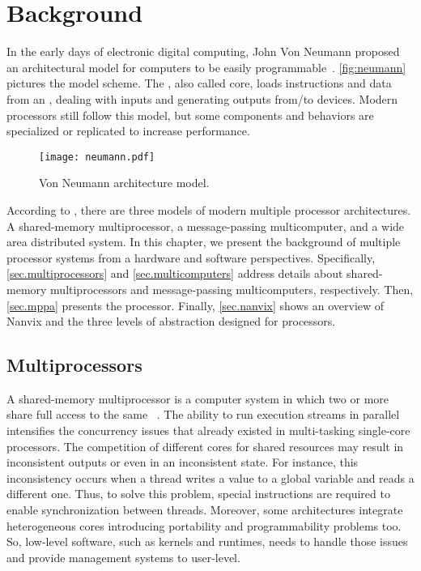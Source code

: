 \chapter{Background}
\label{ch.background}

	In the early days of electronic digital computing, John Von Neumann
	proposed an architectural model for computers to be easily programmable~\cite{von-neumann:model}.
	\autoref{fig:neumann} pictures the model scheme.
	The \cpu, also called core, loads instructions and data from an \mmu,
	dealing with inputs and generating outputs from/to \io devices.
	Modern processors still follow this model, but some components and
	behaviors are specialized or replicated to increase performance.

	\begin{figure}[!tb]
		\centering%
		\caption{Von Neumann architecture model.}%
		\label{fig:neumann}%
		\texttt{[image: neumann.pdf]}%
	\end{figure}
	
	According to , there are three models of
	modern multiple processor architectures.
	A shared-memory multiprocessor, a message-passing multicomputer, and a wide
	area distributed system.
	In this chapter, we present the background of multiple processor systems from
	a hardware and software perspectives.
	Specifically, \autoref{sec.multiprocessors} and \autoref{sec.multicomputers} address
	details about shared-memory multiprocessors and message-passing multicomputers, respectively.
	Then, \autoref{sec.mppa} presents the \mppa processor.
	Finally, \autoref{sec.nanvix} shows an overview of Nanvix \os and the
	three levels of abstraction designed for \lightweight \manycores processors.

	\section{Multiprocessors}
	\label{sec.multiprocessors}

		A shared-memory multiprocessor is a computer system in which two or more \cpus
		share full access to the same \ram~\cite{tanenbaum:4ed}.
		The ability to run execution streams in parallel intensifies the concurrency
		issues that already existed in multi-tasking single-core processors.
		The competition of different cores for shared resources may result in
		inconsistent outputs or even in an inconsistent \os state.
		For instance, this inconsistency occurs when a thread writes a value to a global variable and
		reads a different one. Thus, to solve this problem, special
		instructions are required to enable synchronization between
		threads.
		Moreover, some architectures integrate heterogeneous cores introducing
		portability and programmability problems too.
		So, low-level software, such as \os kernels and runtimes, needs to handle
		those issues and provide management systems to user-level.

